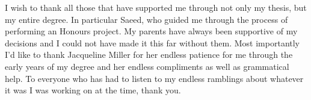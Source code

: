 \documentclass[
12pt, %
oneside, %
english, %
onehalfspacing, %
liststotoc, %
headsepline, %
consistentlayout, %
]{MastersDoctoralThesis} %
\begin{document}
\begin{acknowledgements}
\addchaptertocentry{\acknowledgementname} %
I wish to thank all those that have supported me through not only my thesis, but my entire degree. In particular Saeed, who guided me through the process of performing an
Honours project. My parents have always been supportive of my decisions and I could not have made it this far without them. Most importantly I'd like to thank Jacqueline
Miller for her endless patience for me through the early years of my degree and her endless compliments as well as grammatical help. To everyone who has had to listen to
my endless ramblings about whatever it was I was working on at the time, thank you.
\end{acknowledgements}


\tableofcontents %

\listoffigures %

\listoftables %

\end{document}
